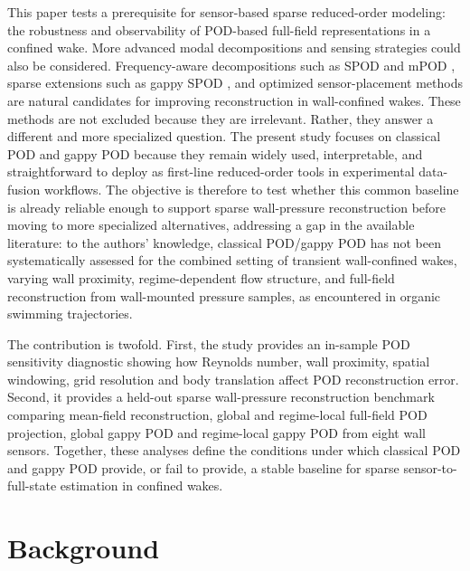 \documentclass[preprint,12pt]{elsarticle}
\begin{document}
This paper tests a prerequisite for sensor-based sparse reduced-order modeling: the robustness and observability of POD-based full-field representations in a confined wake. More advanced modal decompositions and sensing strategies could also be considered. Frequency-aware decompositions such as SPOD \citep{Sieber2016,Towne2018} and mPOD \citep{Mendez2019,Mendez2020}, sparse extensions such as gappy SPOD \citep{Nekkanti2022}, and optimized sensor-placement methods \citep{Manohar2018,Sashittal2021} are natural candidates for improving reconstruction in wall-confined wakes. These methods are not excluded because they are irrelevant. Rather, they answer a different and more specialized question. The present study focuses on classical POD and gappy POD because they remain widely used, interpretable, and straightforward to deploy as first-line reduced-order tools in experimental data-fusion workflows. The objective is therefore to test whether this common baseline is already reliable enough to support sparse wall-pressure reconstruction before moving to more specialized alternatives, addressing a gap in the available literature: to the authors' knowledge, classical POD/gappy POD has not been systematically assessed for the combined setting of transient wall-confined wakes, varying wall proximity, regime-dependent flow structure, and full-field reconstruction from wall-mounted pressure samples, as encountered in organic swimming trajectories.

The contribution is twofold. First, the study provides an in-sample POD sensitivity diagnostic showing how Reynolds number, wall proximity, spatial windowing, grid resolution and body translation affect POD reconstruction error. Second, it provides a held-out sparse wall-pressure reconstruction benchmark comparing mean-field reconstruction, global and regime-local full-field POD projection, global gappy POD and regime-local gappy POD from eight wall sensors. Together, these analyses define the conditions under which classical POD and gappy POD provide, or fail to provide, a stable baseline for sparse sensor-to-full-state estimation in confined wakes.

\section{Background}
\label{sec2}
\end{document}
